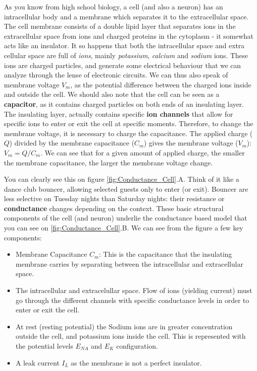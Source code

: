 As you know from high school biology, a cell (and also a neuron) has an intracellular body and a membrane which separates it to the extracellular space. The cell membrane consists of a double lipid layer that separates ions in the extracellular space from ions and charged proteins in the cytoplasm - it somewhat acts like an insulator. It so happens that both the intracellular space and extra cellular space are full of \textit{ions}, mainly \textit{potassium}, \textit{calcium} and \textit{sodium} ions. These ions are charged particles, and generate some electrical behaviour that we can analyze through the lense of electronic circuits. We can thus also speak of membrane voltage $V_m$, as the potential difference between the charged ions inside and outside the cell. We should also note that the cell can be seen as a \textbf{capacitor}, as it contains charged particles on both ends of an insulating layer. The insulating layer, actually contains specific \textbf{ion channels} that allow for specific ions to enter or exit the cell at specific moments. Therefore, to change the membrane voltage, it is necessary to charge the capacitance. The applied charge ($Q$) divided by the membrane capacitance ($C_m$) gives the membrane voltage ($V_m$): $V_m = Q /C_m$. We can see that for a given amount of applied charge, the smaller the membrane capacitance, the larger the membrane voltage change.

You can clearly see this on figure \ref{fig:Conductance_Cell}.A. Think of it like a dance club bouncer, allowing selected guests only to enter (or exit). Bouncer are less selective on Tuesday nights than Saturday nights: their resistance or \textbf{conductance} changes depending on the context. These basic structural components of the cell (and neuron) underlie the conductance based model that you can see on \ref{fig:Conductance_Cell}.B. We can see from the figure a few key components: 
\begin{itemize}
    \item Membrane Capacitance $C_m$: This is the capacitance that the insulating membrane carries by separating between the intracellular and extracellular space.
     \item The intracellular and extracelullar space. Flow of ions (yielding current) must go through the different channels with specific conductance levels in order to enter or exit the cell. 
    \item At rest (resting potential) the Sodium ions are in greater concentration outside the cell, and potassium ions inside the cell. This is represented with the potential levels $E_{NA}$ and $E_{K}$ configuration. 
    \item A leak current $I_L$ as the membrane is not a perfect insulator. 
\end{itemize}

